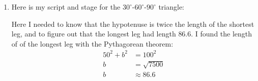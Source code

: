 \documentclass{ximera}
\begin{document}
\begin{question}
\begin{freeResponse}
\begin{enumerate}
    \item Here is my script and stage for the $30^\circ$-$60^\circ$-$90^\circ$ triangle:
      \begin{center}
        \qquad
      \end{center}
      Here I needed to know that the hypotenuse is twice the length of
      the shortest leg, and to figure out that the longest leg had
      length $86.6$.  I found the length of of the longest leg with
      the Pythagorean theorem:
      \begin{align*}
      50^2 + b^2 &= 100^2\\
      b &= \sqrt{7500}\\
      b &\approx 86.6
      \end{align*}
    

\end{enumerate}
\end{freeResponse}
\end{question}
\end{document}
